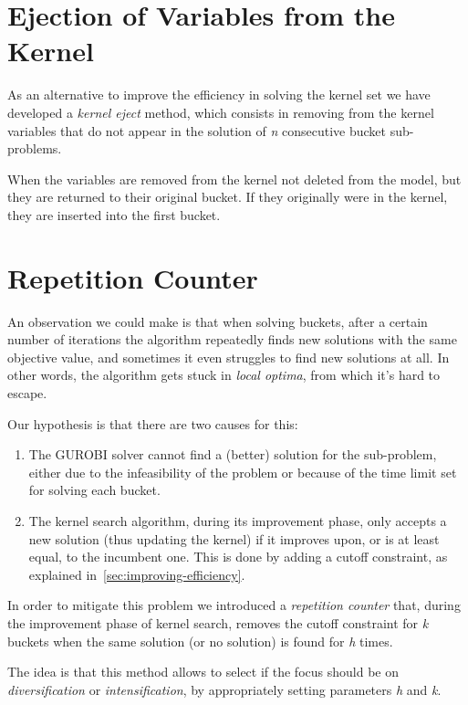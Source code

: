 \section{Ejection of Variables from the Kernel}
As an alternative to improve the efficiency in solving the kernel set
we have developed a \textit{kernel eject} method,
which consists in removing from the kernel variables
that do not appear in the solution of \textit{n}
consecutive bucket sub-problems.

When the variables are removed from the kernel
not deleted from the model, but they are returned to their original bucket.
If they originally were in the kernel, they are inserted into the first bucket.


\section{Repetition Counter}
An observation we could make is that when solving buckets,
after a certain number of iterations the algorithm
repeatedly finds new solutions with the same objective value,
and sometimes it even struggles to find new solutions at all.
In other words, the algorithm gets stuck in \textit{local optima},
from which it's hard to escape.

Our hypothesis is that there are two causes for this:
\begin{enumerate}
    \item The GUROBI solver cannot find a (better) solution for the sub-problem,
    either due to the infeasibility of the problem or because of
    the time limit set for solving each bucket.
    \item The kernel search algorithm, during its improvement phase,
    only accepts a new solution (thus updating the kernel)
    if it improves upon, or is at least equal, to the incumbent one.
    This is done by adding a cutoff constraint, as explained in~\ref{sec:improving-efficiency}.
\end{enumerate}

In order to mitigate this problem we introduced a \textit{repetition counter}
that, during the improvement phase of kernel search,
removes the cutoff constraint for \textit{k} buckets
when the same solution (or no solution) is found for \textit{h} times.

The idea is that this method allows to select if the focus should be on
\textit{diversification} or \textit{intensification},
by appropriately setting parameters \textit{h} and \textit{k}.

